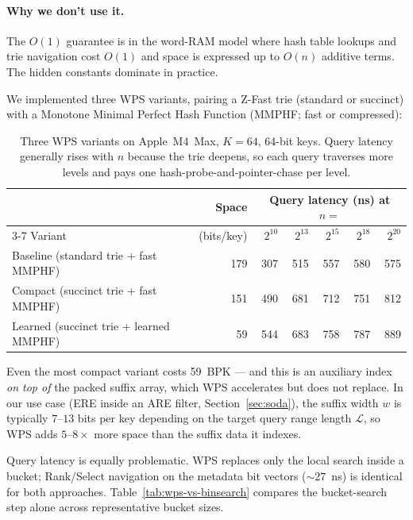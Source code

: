 \paragraph{Why we don't use it.}
The $O(1)$ guarantee is in the word-RAM model where hash table
lookups and trie navigation cost $O(1)$ and space is expressed up
to $O(n)$ additive terms. The hidden constants dominate in
practice.

We implemented three WPS variants, pairing a Z-Fast trie (standard or
succinct) with a Monotone Minimal Perfect Hash Function (MMPHF; fast or
compressed):

\begin{table}[H]
    \centering
    \begin{tabular}{@{}lrrrrrr@{}}
        \toprule
                                                & Space   & \multicolumn{5}{c}{Query latency (ns) at $n =$} \\
        \cmidrule(lr){3-7}
        Variant                                 & (bits/key) & $2^{10}$ & $2^{13}$ & $2^{15}$ & $2^{18}$ & $2^{20}$ \\
        \midrule
        Baseline (standard trie + fast MMPHF)   & 179        & 307      & 515      & 557      & 580      & 575      \\
        Compact (succinct trie + fast MMPHF)    & 151        & 490      & 681      & 712      & 751      & 812      \\
        Learned (succinct trie + learned MMPHF) & 59         & 544      & 683      & 758      & 787      & 889      \\
        \bottomrule
    \end{tabular}
    \caption{Three WPS variants on Apple~M4~Max, $K = 64$, 64-bit keys.
        Query latency generally rises with $n$ because the trie deepens,
        so each query traverses more levels and pays one
        hash-probe-and-pointer-chase per level.
}
    \label{tab:wps-cost}
\end{table}

Even the most compact variant costs 59~BPK --- and this is an auxiliary
index \emph{on top of} the packed suffix array, which WPS accelerates but
does not replace. In our use case (ERE inside an ARE
filter, Section~\ref{sec:soda}), the suffix width $w$ is typically
$7$--$13$ bits per key depending on the target query range length $\mathcal{L}$, so WPS adds $5$--$8\times$ more space than the
suffix data it indexes.

Query latency is equally problematic. WPS replaces only the local search
inside a bucket; Rank/Select navigation on the metadata bit vectors
(${\sim}27$~ns) is identical for both approaches.
Table~\ref{tab:wps-vs-binsearch} compares the bucket-search step alone
across representative bucket sizes.

